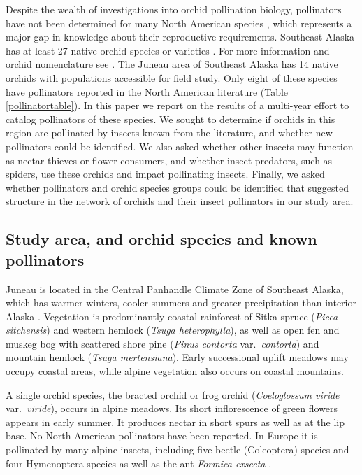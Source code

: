 \begin{multicols}{2}
Despite the wealth of investigations into orchid pollination biology,
pollinators have not been determined for many North American species
\citep{Argue2012a, Argue2012b}, which represents a major gap in knowledge about their
reproductive requirements. Southeast Alaska has at least 27 native
orchid species or varieties \citep[e.g.,][]{Hulten1968, Brown2006}. For more
information and orchid nomenclature see \citet{BowlesArmstrong2019}. The
Juneau area of Southeast Alaska has 14 native orchids with populations
accessible for field study. Only eight of these species have pollinators
reported in the North American literature (Table \ref{pollinatortable}). In this paper we
report on the results of a multi-year effort to catalog pollinators of
these species. We sought to determine if orchids in this region are
pollinated by insects known from the literature, and whether new
pollinators could be identified. We also asked whether other insects may
function as nectar thieves or flower consumers, and whether insect
predators, such as spiders, use these orchids and impact pollinating
insects. Finally, we asked whether pollinators and orchid species groups could be identified that suggested
structure in the network of orchids and their insect pollinators in our
study area.

\subsection{Study area, and orchid species and known pollinators}

Juneau is located in the Central Panhandle Climate Zone of Southeast
Alaska, which has warmer winters, cooler summers and greater
precipitation than interior Alaska \citep{Bienieketal2012}. Vegetation is
predominantly coastal rainforest of Sitka spruce (\emph{Picea
sitchensis}) and western hemlock (\emph{Tsuga heterophylla}), as well as
open fen and muskeg bog with scattered shore pine (\emph{Pinus contorta}
var.\ \emph{contorta}) and mountain hemlock (\emph{Tsuga mertensiana}).
Early successional uplift meadows may occupy coastal areas, while alpine
vegetation also occurs on coastal mountains.

A single orchid species, the bracted orchid or frog orchid
(\emph{Coeloglossum viride} var.\ \emph{viride}), occurs in alpine
meadows. Its short inflorescence of green flowers appears in early
summer. It produces nectar in short spurs as well as at the lip base. No
North American pollinators have been reported. In Europe it is
pollinated by many alpine insects, including five beetle (Coleoptera)
species and four Hymenoptera species as well as the ant \emph{Formica
exsecta} \citep{ClaessensSeiffert2017}.

\end{multicols}
